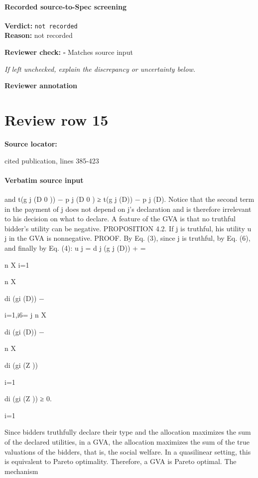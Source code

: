 \documentclass[10pt]{article}
\newcommand{\reviewerbox}{%
  \par\noindent\fbox{\parbox{0.96\linewidth}{\rule{0pt}{0.38in}}}\par
}
\newcommand{\reviewmatch}[1]{%
  \par\noindent\textbf{Reviewer check:} $\square$\; #1\par
  \noindent\emph{If left unchecked, explain the discrepancy or uncertainty below.}\par
}
\begin{document}
\paragraph{Recorded source-to-Spec screening}
\textbf{Verdict:} \texttt{not recorded}
\\
\textbf{Reason:} not recorded
\reviewmatch{Matches source input}
\noindent\textbf{Reviewer annotation}\par
\reviewerbox
\clearpage
\hypertarget{source-claim-9a3ae33d2b205d48}{}
\section*{Review row 15}
\textbf{Source locator:} {\footnotesize\raggedright cited publication, lines 385-\allowbreak{}423\par}
\paragraph{Verbatim source input}
\begin{ReviewVerbatim}
and t(g j (D 0 )) − p j (D 0 ) ≥ t(g j (D)) − p j (D).
Notice that the second term in the payment of j does not depend on j’s declaration
and is therefore irrelevant to his decision on what to declare. A feature of the GVA
is that no truthful bidder’s utility can be negative.
PROPOSITION 4.2. If j is truthful, his utility u j in the GVA is nonnegative.
PROOF. By Eq. (3), since j is truthful, by Eq. (6), and finally by Eq. (4):
u j = d j (g j (D)) +
=

n
X
i=1

n
X

di (gi (D)) −

i=1,i6= j
n
X

di (gi (D)) −

n
X

di (gi (Z ))

i=1

di (gi (Z )) ≥ 0.

i=1

Since bidders truthfully declare their type and the allocation maximizes the sum
of the declared utilities, in a GVA, the allocation maximizes the sum of the true
valuations of the bidders, that is, the social welfare. In a quasilinear setting, this is
equivalent to Pareto optimality. Therefore, a GVA is Pareto optimal. The mechanism
\end{ReviewVerbatim}
\end{document}
